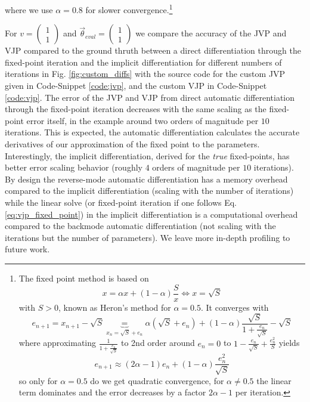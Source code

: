where we use $\alpha = 0.8$ for slower convergence.\footnote{
The fixed point method is based on
\begin{equation}
    x = \alpha x + (1-\alpha)\frac{S}{x} \iff x = \sqrt{S}
\end{equation}
with $S>0$, known as Heron's method for $\alpha = 0.5$.
It converges with
\begin{equation}
    e_{n+1} = x_{n+1} - \sqrt{S} \underbrace{=}_{x_n = \sqrt{S} + e_n} \alpha (\sqrt{S} + e_n) + (1-\alpha)\frac{\sqrt{S}}{1 + \frac{e_n}{\sqrt{S}}} - \sqrt{S} 
\end{equation}
where approximating $\frac{1}{1 + \frac{e_n}{\sqrt{S}}}$ to 2nd order around $e_n = 0$ to $1 - \frac{e_n}{\sqrt{S}} + \frac{e_n^2}{S}$ yields
\begin{equation}
    e_{n+1} \approx (2\alpha-1) e_n + (1-\alpha)\frac{e_n^2}{\sqrt{S}}
\end{equation}
so only for $\alpha = 0.5$ do we get quadratic convergence, for $\alpha \ne 0.5$ the linear
term dominates and the error decreases by a factor $2\alpha - 1$ per iteration.}

For $v = \begin{pmatrix} 1 \\ 1 \end{pmatrix}$ and $\vec{\theta}_{eval} = \begin{pmatrix} 1 \\ 1 \end{pmatrix}$
we compare the accuracy of the JVP and VJP compared to the ground thruth between a direct differentiation
through the fixed-point iteration and the implicit differentiation for different numbers of iterations in
Fig. \ref{fig:custom_diffs} with the source code for the custom JVP given in Code-Snippet \ref{code:jvp},
and the custom VJP in Code-Snippet \ref{code:vjp}. The error of the JVP and VJP from direct
automatic differentiation through the fixed-point iteration decreases with the same scaling
as the fixed-point error itself, in the example around two orders of magnitude per $10$ iterations.
This is expected, the automatic differentiation calculates the accurate derivatives of our approximation
of the fixed point to the parameters. Interestingly, the implicit differentiation, derived for
the \textit{true} fixed-points, has better error scaling behavior (roughly $4$ orders of
magnitude per $10$ iterations). By design the reverse-mode automatic differentiation
has a memory overhead compared to the implicit differentiation (scaling with the number of iterations)
while the linear solve (or fixed-point iteration if one follows Eq. \ref{eq:vjp_fixed_point}) 
in the implicit differentiation is a computational overhead compared to the backmode automatic
differentiation (not scaling with the iterations but the number of parameters). We leave
more in-depth profiling to future work.

